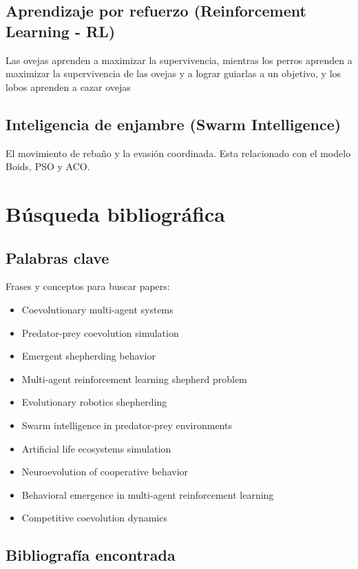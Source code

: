 \documentclass[final]{article}
\begin{document}
\subsection{Aprendizaje por refuerzo (Reinforcement Learning - RL)}
Las ovejas aprenden a maximizar la supervivencia, mientras los perros aprenden a maximizar la supervivencia de las ovejas y a lograr
guiarlas a un objetivo, y los lobos aprenden a cazar ovejas

\subsection{Inteligencia de enjambre (Swarm Intelligence)}
El movimiento de rebaño y la evasión coordinada. Esta relacionado con el modelo Boids, PSO y ACO.

\section{Búsqueda bibliográfica}

\subsection{Palabras clave}
Frases y conceptos para buscar papers:
\begin{itemize}
    \item Coevolutionary multi-agent systems
    \item Predator-prey coevolution simulation
    \item Emergent shepherding behavior
    \item Multi-agent reinforcement learning shepherd problem
    \item Evolutionary robotics shepherding
    \item Swarm intelligence in predator-prey environments
    \item Artificial life ecosystems simulation
    \item Neuroevolution of cooperative behavior
    \item Behavioral emergence in multi-agent reinforcement learning
    \item Competitive coevolution dynamics
\end{itemize}

\subsection{Bibliografía encontrada}
\end{document}

